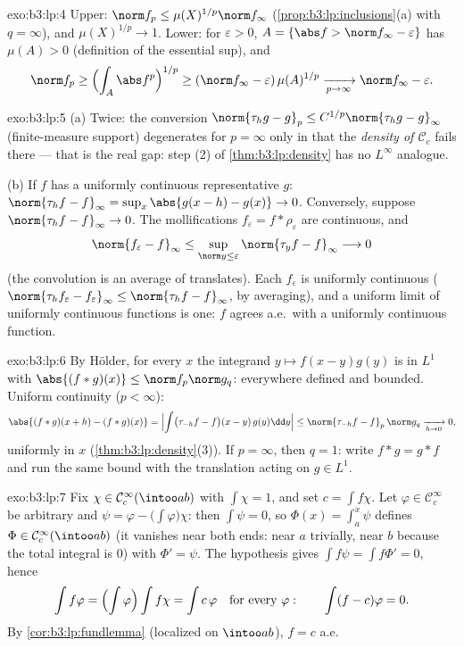 \begin{solution}{exo:b3:lp:4}
Upper: $\norm f_p \leq \mu(X)^{1/p}\norm f_\infty$
(\cref{prop:b3:lp:inclusions}(a) with $q = \infty$), and
$\mu(X)^{1/p} \to 1$. Lower: for $\varepsilon > 0$, $A =
\{\abs f > \norm f_\infty - \varepsilon\}$ has $\mu(A) > 0$
(definition of the essential sup), and
\[
\norm f_p \geq \Bigl(\int_A \abs f^p\Bigr)^{1/p}
\geq (\norm f_\infty - \varepsilon)\,\mu(A)^{1/p}
\xrightarrow[p\to\infty]{} \norm f_\infty - \varepsilon .
\]
\end{solution}

\begin{solution}{exo:b3:lp:5}
(a) Twice: the conversion $\norm{\tau_hg - g}_p \leq
C^{1/p}\norm{\tau_hg - g}_\infty$ (finite-measure support)
degenerates for $p = \infty$ only in that the \emph{density of
$\mathcal C_c$} fails there --- that is the real gap: step (2)
of \cref{thm:b3:lp:density} has no $L^\infty$ analogue.

(b) If $f$ has a uniformly continuous representative $g$:
$\norm{\tau_hf - f}_\infty = \sup_x\abs{g(x - h) - g(x)} \to
0$. Conversely, suppose $\norm{\tau_hf - f}_\infty \to 0$. The
mollifications $f_\varepsilon = f * \rho_\varepsilon$ are
continuous, and
\[
\norm{f_\varepsilon - f}_\infty
\leq \sup_{\norm y \leq \varepsilon}\norm{\tau_yf -
f}_\infty \longrightarrow 0
\]
(the convolution is an average of translates). Each
$f_\varepsilon$ is uniformly continuous
($\norm{\tau_hf_\varepsilon - f_\varepsilon}_\infty \leq
\norm{\tau_hf - f}_\infty$, by averaging), and a uniform limit
of uniformly continuous functions is one: $f$ agrees a.e.\
with a uniformly continuous function.
\end{solution}

\begin{solution}{exo:b3:lp:6}
By H\"older, for every $x$ the integrand $y \mapsto f(x -
y)g(y)$ is in $L^1$ with $\abs{(f*g)(x)} \leq \norm f_p\norm
g_q$: everywhere defined and bounded. Uniform continuity ($p <
\infty$):
\[
\abs{(f*g)(x + h) - (f*g)(x)}
= \Bigl|\int\bigl(\tau_{-h}f - f\bigr)(x - y)\,g(y)\dd y\Bigr|
\leq \norm{\tau_{-h}f - f}_p\,\norm g_q
\xrightarrow[h\to0]{} 0,
\]
uniformly in $x$ (\cref{thm:b3:lp:density}(3)). If $p =
\infty$, then $q = 1$: write $f * g = g * f$ and run the same
bound with the translation acting on $g \in L^1$.
\end{solution}

\begin{solution}{exo:b3:lp:7}
Fix $\chi \in \mathcal C_c^\infty(\intoo ab)$ with $\int\chi =
1$, and set $c = \int f\chi$. Let $\varphi \in \mathcal
C_c^\infty$ be arbitrary and $\psi = \varphi -
\bigl(\int\varphi\bigr)\chi$: then $\int\psi = 0$, so $\Phi(x)
= \int_a^x\psi$ defines $\Phi \in \mathcal C_c^\infty(\intoo
ab)$ (it vanishes near both ends: near $a$ trivially, near $b$
because the total integral is $0$) with $\Phi' = \psi$. The
hypothesis gives $\int f\psi = \int f\Phi' = 0$, hence
\[
\int f\varphi = \Bigl(\int\varphi\Bigr)\int f\chi = \int
c\,\varphi
\quad\text{for every } \varphi:
\qquad \int(f - c)\varphi = 0 .
\]
By \cref{cor:b3:lp:fundlemma} (localized on $\intoo ab$), $f =
c$ a.e.
\end{solution}

